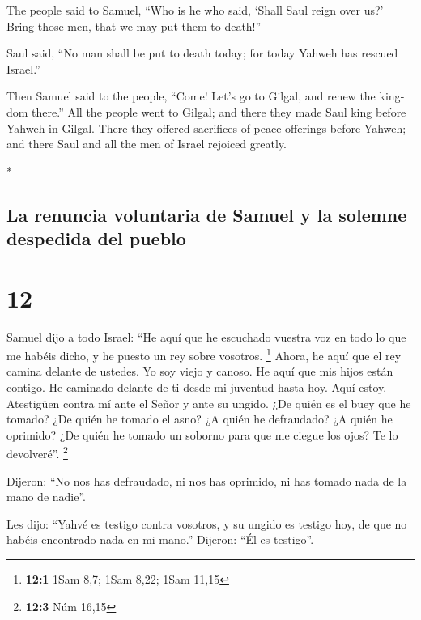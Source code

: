 \begin{paracol}{2}
\begin{otherlanguage}{english}
 The people said to Samuel, ``Who is he who said, `Shall
Saul reign over us?' Bring those men, that we may put them to death!''

 Saul said, ``No man shall be put to death today; for
today Yahweh has rescued Israel.''

 Then Samuel said to the people, ``Come! Let's go to
Gilgal, and renew the kingdom there.''  All the people
went to Gilgal; and there they made Saul king before Yahweh in Gilgal.
There they offered sacrifices of peace offerings before Yahweh; and
there Saul and all the men of Israel rejoiced greatly.

\end{otherlanguage}

\switchcolumn[0]*

\hypertarget{la-renuncia-voluntaria-de-samuel-y-la-solemne-despedida-del-pueblo}{%
\subsection{La renuncia voluntaria de Samuel y la solemne despedida del
pueblo}\label{la-renuncia-voluntaria-de-samuel-y-la-solemne-despedida-del-pueblo}}

\hypertarget{section-22}{%
\section{12}\label{section-22}}

 Samuel dijo a todo Israel: ``He aquí que he escuchado
vuestra voz en todo lo que me habéis dicho, y he puesto un rey sobre
vosotros. \footnote{\textbf{12:1} 1Sam 8,7; 1Sam 8,22; 1Sam 11,15}
 Ahora, he aquí que el rey camina delante de ustedes. Yo
soy viejo y canoso. He aquí que mis hijos están contigo. He caminado
delante de ti desde mi juventud hasta hoy.  Aquí estoy.
Atestigüen contra mí ante el Señor y ante su ungido. ¿De quién es el
buey que he tomado? ¿De quién he tomado el asno? ¿A quién he defraudado?
¿A quién he oprimido? ¿De quién he tomado un soborno para que me ciegue
los ojos? Te lo devolveré''. \footnote{\textbf{12:3} Núm 16,15}

 Dijeron: ``No nos has defraudado, ni nos has oprimido, ni
has tomado nada de la mano de nadie''.

 Les dijo: ``Yahvé es testigo contra vosotros, y su ungido
es testigo hoy, de que no habéis encontrado nada en mi mano.'' Dijeron:
``Él es testigo''.


\end{paracol}
